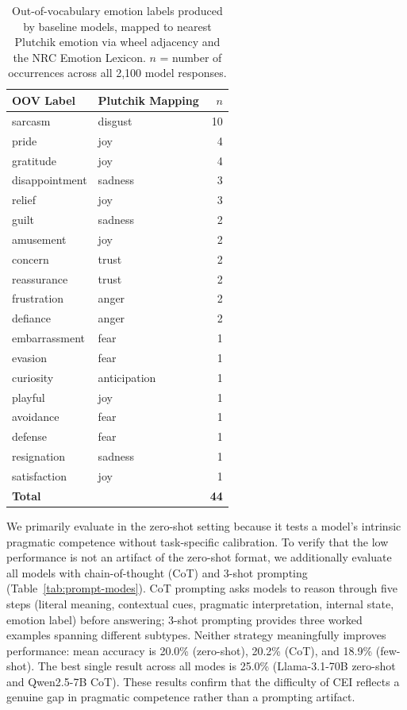 \documentclass[twoside,11pt]{article}
\begin{document}
\begin{table}[t]
\centering
\caption{Out-of-vocabulary emotion labels produced by baseline models, mapped to nearest Plutchik emotion via wheel adjacency and the NRC Emotion Lexicon. $n$ = number of occurrences across all 2,100 model responses.}
\label{tab:oov-mapping}
\small
\begin{tabular}{@{}llr@{}}
\toprule
\textbf{OOV Label} & \textbf{Plutchik Mapping} & \textbf{$n$} \\
\midrule
sarcasm        & disgust       & 10 \\
pride          & joy           & 4 \\
gratitude      & joy           & 4 \\
disappointment & sadness       & 3 \\
relief         & joy           & 3 \\
guilt          & sadness       & 2 \\
amusement      & joy           & 2 \\
concern        & trust         & 2 \\
reassurance    & trust         & 2 \\
frustration    & anger         & 2 \\
defiance       & anger         & 2 \\
embarrassment  & fear          & 1 \\
evasion        & fear          & 1 \\
curiosity      & anticipation  & 1 \\
playful        & joy           & 1 \\
avoidance      & fear          & 1 \\
defense        & fear          & 1 \\
resignation    & sadness       & 1 \\
satisfaction   & joy           & 1 \\
\midrule
\textbf{Total} &               & \textbf{44} \\
\bottomrule
\end{tabular}
\end{table}

We primarily evaluate in the zero-shot setting because it tests a model's intrinsic pragmatic competence without task-specific calibration. To verify that the low performance is not an artifact of the zero-shot format, we additionally evaluate all models with chain-of-thought (CoT) and 3-shot prompting (Table~\ref{tab:prompt-modes}). CoT prompting asks models to reason through five steps (literal meaning, contextual cues, pragmatic interpretation, internal state, emotion label) before answering; 3-shot prompting provides three worked examples spanning different subtypes. Neither strategy meaningfully improves performance: mean accuracy is 20.0\% (zero-shot), 20.2\% (CoT), and 18.9\% (few-shot). The best single result across all modes is 25.0\% (Llama-3.1-70B zero-shot and Qwen2.5-7B CoT). These results confirm that the difficulty of CEI reflects a genuine gap in pragmatic competence rather than a prompting artifact.
\end{document}
